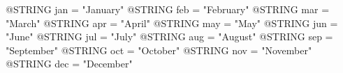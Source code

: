 \usepackage{booktabs}       %
\usepackage{hyperref}       %
\usepackage{url}            %
\usepackage{placeins}
\usepackage{float}
\usepackage{fullpage}
\usepackage{tikz}

\usepackage{authblk}


@STRING{ jan = "January" }
@STRING{ feb = "February" }
@STRING{ mar = "March" }
@STRING{ apr = "April" }
@STRING{ may = "May" }
@STRING{ jun = "June" }
@STRING{ jul = "July" }
@STRING{ aug = "August" }
@STRING{ sep = "September" }
@STRING{ oct = "October" }
@STRING{ nov = "November" }
@STRING{ dec = "December" }
